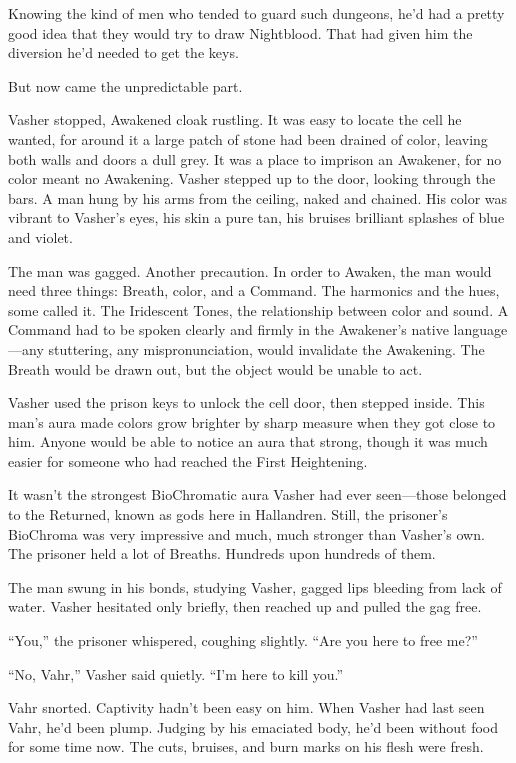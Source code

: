 Knowing the kind of men who tended to guard such dungeons, he’d had a pretty good idea that they would try to draw Nightblood. That had given him the diversion he’d needed to get the keys.

But now came the unpredictable part.

Vasher stopped, Awakened cloak rustling. It was easy to locate the cell he wanted, for around it a large patch of stone had been drained of color, leaving both walls and doors a dull grey. It was a place to imprison an Awakener, for no color meant no Awakening. Vasher stepped up to the door, looking through the bars. A man hung by his arms from the ceiling, naked and chained. His color was vibrant to Vasher’s eyes, his skin a pure tan, his bruises brilliant splashes of blue and violet.

The man was gagged. Another precaution. In order to Awaken, the man would need three things: Breath, color, and a Command. The harmonics and the hues, some called it. The Iridescent Tones, the relationship between color and sound. A Command had to be spoken clearly and firmly in the Awakener’s native language—any stuttering, any mispronunciation, would invalidate the Awakening. The Breath would be drawn out, but the object would be unable to act.

Vasher used the prison keys to unlock the cell door, then stepped inside. This man’s aura made colors grow brighter by sharp measure when they got close to him. Anyone would be able to notice an aura that strong, though it was much easier for someone who had reached the First Heightening.

It wasn’t the strongest BioChromatic aura Vasher had ever seen—those belonged to the Returned, known as gods here in Hallandren. Still, the prisoner’s BioChroma was very impressive and much, much stronger than Vasher’s own. The prisoner held a lot of Breaths. Hundreds upon hundreds of them.

The man swung in his bonds, studying Vasher, gagged lips bleeding from lack of water. Vasher hesitated only briefly, then reached up and pulled the gag free.

“You,” the prisoner whispered, coughing slightly. “Are you here to free me?”

“No, Vahr,” Vasher said quietly. “I’m here to kill you.”

Vahr snorted. Captivity hadn’t been easy on him. When Vasher had last seen Vahr, he’d been plump. Judging by his emaciated body, he’d been without food for some time now. The cuts, bruises, and burn marks on his flesh were fresh.

